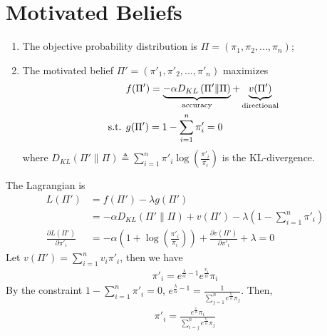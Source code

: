 \documentclass[11pt]{elegantbook}
\begin{document}
\section{Motivated Beliefs}
\begin{enumerate}
    \item The objective probability distribution is $\Pi=\left(\pi_1,\pi_2,...,\pi_n\right)$;
    \item The motivated belief $\Pi'=\left(\pi'_1,\pi'_2,...,\pi'_n\right)$ maximizes
    \begin{equation}
        \begin{aligned}
            &f(\Pi')=\underbrace{-\alpha D_{KL}\left(\Pi'\|\Pi\right)}_\text{accuracy}+\underbrace{v(\Pi')}_\text{directional}\\
            \textnormal{s.t. }&g(\Pi')=1-\sum_{i=1}^n\pi'_i=0
        \end{aligned}
        \nonumber
    \end{equation}
    where $D_{KL}\left(\Pi'\|\Pi\right)\triangleq \sum_{i=1}^n \pi'_i\log\left(\frac{\pi'_i}{\pi_i}\right)$ is the KL-divergence.
\end{enumerate}
The Lagrangian is
\begin{equation}
    \begin{aligned}
        L(\Pi')&=f(\Pi')-\lambda g(\Pi')\\
        &=-\alpha D_{KL}\left(\Pi'\|\Pi\right)+v(\Pi')-\lambda(1-\sum_{i=1}^n\pi'_i)\\
        \frac{\partial L(\Pi')}{\partial \pi'_i}&=-\alpha\left(1+\log\left(\frac{\pi'_i}{\pi_i}\right)\right)+\frac{\partial v(\Pi')}{\partial \pi'_i}+\lambda=0
    \end{aligned}
    \nonumber
\end{equation}
Let $v(\Pi')=\sum_{i=1}^n v_i \pi'_i$, then we have
\begin{equation}
    \begin{aligned}
        \pi'_i=e^{\frac{\lambda}{\alpha}-1}e^{\frac{v_i}{\alpha}}\pi_i
    \end{aligned}
    \nonumber
\end{equation}
By the constraint $1-\sum_{i=1}^n\pi'_i=0$, $e^{\frac{\lambda}{\alpha}-1}=\frac{1}{\sum_{j=1}^ne^{\frac{v_j}{\alpha}}\pi_j}$. Then,
\begin{equation}
    \begin{aligned}
        \pi'_i=\frac{e^{\frac{v_i}{\alpha}}\pi_i}{\sum_{i=j}^ne^{\frac{v_j}{\alpha}}\pi_j}
    \end{aligned}
    \nonumber
\end{equation}
\end{document}
